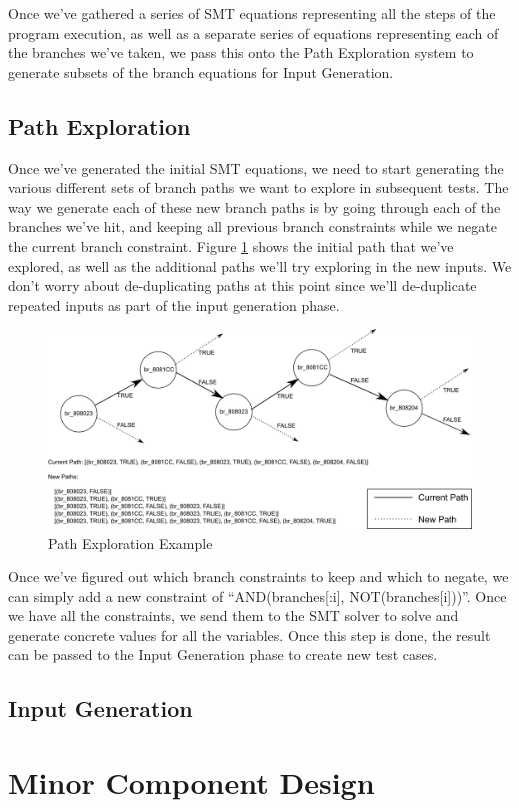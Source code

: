Once we've gathered a series of SMT equations representing all the steps of the
program execution, as well as a separate series of equations representing each
of the branches we've taken, we pass this onto the Path Exploration system to
generate subsets of the branch equations for Input Generation.

\subsection{Path Exploration}
Once we've generated the initial SMT equations, we need to start generating the
various different sets of branch paths we want to explore in subsequent
tests. The way we generate each of these new branch paths is by going through
each of the branches we've hit, and keeping all previous branch constraints
while we negate the current branch constraint. Figure \ref{figure:pathexplore}
shows the initial path that we've explored, as well as the additional paths
we'll try exploring in the new inputs. We don't worry about de-duplicating paths
at this point since we'll de-duplicate repeated inputs as part of the input
generation phase.

\begin{figure}[ht]
 \centering
 \includegraphics{pathexplore}
 \caption{Path Exploration Example}
 \label{figure:pathexplore}
\end{figure}

Once we've figured out which branch constraints to keep and which to negate, we
can simply add a new constraint of ``AND(branches[:i], NOT(branches[i]))''. Once
we have all the constraints, we send them to the SMT solver to solve and
generate concrete values for all the variables. Once this step is done, the
result can be passed to the Input Generation phase to create new test cases.

\subsection{Input Generation}


\section{Minor Component Design}
